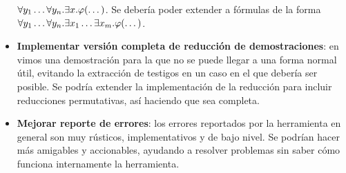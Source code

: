 \begin{itemize}
    $\forall y_1 \dots \forall y_n . \exists x .
    \varphi(\dots)$. Se debería poder extender a fórmulas de la forma $\forall
    y_1 \dots \forall y_n . \exists x_1 \dots \exists x_m .
    \varphi(\dots)$.
    \item \textbf{Implementar versión completa de reducción de demostraciones}:
    en  vimos una demostración para la que no
    se puede llegar a una forma normal útil, evitando la extracción de testigos
    en un caso en el que debería ser posible. Se podría extender la
    implementación de la reducción para incluir reducciones permutativas, así
    haciendo que sea completa.
    \item \textbf{Mejorar reporte de errores}: los errores reportados por la
    herramienta en general son muy rústicos, implementativos y de bajo nivel. Se
    podrían hacer más amigables y accionables, ayudando a resolver problemas sin
    saber cómo funciona internamente la herramienta.
\end{itemize}